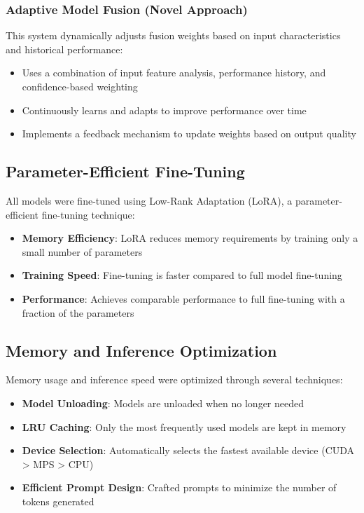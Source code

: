 \documentclass[10pt,twocolumn,letterpaper]{article}
\begin{document}
\subsubsection{Adaptive Model Fusion (Novel Approach)}
This system dynamically adjusts fusion weights based on input characteristics and historical performance:
\begin{itemize}
    \item Uses a combination of input feature analysis, performance history, and confidence-based weighting
    \item Continuously learns and adapts to improve performance over time
    \item Implements a feedback mechanism to update weights based on output quality
\end{itemize}

\subsection{Parameter-Efficient Fine-Tuning}

All models were fine-tuned using Low-Rank Adaptation (LoRA), a parameter-efficient fine-tuning technique:
\begin{itemize}
    \item \textbf{Memory Efficiency}: LoRA reduces memory requirements by training only a small number of parameters
    \item \textbf{Training Speed}: Fine-tuning is faster compared to full model fine-tuning
    \item \textbf{Performance}: Achieves comparable performance to full fine-tuning with a fraction of the parameters
\end{itemize}

\subsection{Memory and Inference Optimization}

Memory usage and inference speed were optimized through several techniques:
\begin{itemize}
    \item \textbf{Model Unloading}: Models are unloaded when no longer needed
    \item \textbf{LRU Caching}: Only the most frequently used models are kept in memory
    \item \textbf{Device Selection}: Automatically selects the fastest available device (CUDA > MPS > CPU)
    \item \textbf{Efficient Prompt Design}: Crafted prompts to minimize the number of tokens generated
\end{itemize}
\end{document}
